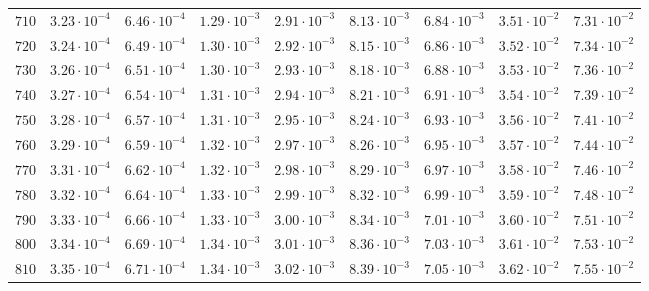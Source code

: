 \begin{landscape}
\begin{table}
\begin{tabular}{lcccccccc}
$	710	$ & $	3.23 \cdot 10^{-4}	$ & $	6.46 \cdot 10^{-4}	$ & $	1.29 \cdot 10^{-3}	$ & $	2.91 \cdot 10^{-3}	$ & $	8.13 \cdot 10^{-3}	$ & $	6.84 \cdot 10^{-3}	$ & $	3.51 \cdot 10^{-2}	$ & $	7.31 \cdot 10^{-2}	 $ \\
$	720	$ & $	3.24 \cdot 10^{-4}	$ & $	6.49 \cdot 10^{-4}	$ & $	1.30 \cdot 10^{-3}	$ & $	2.92 \cdot 10^{-3}	$ & $	8.15 \cdot 10^{-3}	$ & $	6.86 \cdot 10^{-3}	$ & $	3.52 \cdot 10^{-2}	$ & $	7.34 \cdot 10^{-2}	 $ \\
$	730	$ & $	3.26 \cdot 10^{-4}	$ & $	6.51 \cdot 10^{-4}	$ & $	1.30 \cdot 10^{-3}	$ & $	2.93 \cdot 10^{-3}	$ & $	8.18 \cdot 10^{-3}	$ & $	6.88 \cdot 10^{-3}	$ & $	3.53 \cdot 10^{-2}	$ & $	7.36 \cdot 10^{-2}	 $ \\
$	740	$ & $	3.27 \cdot 10^{-4}	$ & $	6.54 \cdot 10^{-4}	$ & $	1.31 \cdot 10^{-3}	$ & $	2.94 \cdot 10^{-3}	$ & $	8.21 \cdot 10^{-3}	$ & $	6.91 \cdot 10^{-3}	$ & $	3.54 \cdot 10^{-2}	$ & $	7.39 \cdot 10^{-2}	 $ \\
$	750	$ & $	3.28 \cdot 10^{-4}	$ & $	6.57 \cdot 10^{-4}	$ & $	1.31 \cdot 10^{-3}	$ & $	2.95 \cdot 10^{-3}	$ & $	8.24 \cdot 10^{-3}	$ & $	6.93 \cdot 10^{-3}	$ & $	3.56 \cdot 10^{-2}	$ & $	7.41 \cdot 10^{-2}	 $ \\
$	760	$ & $	3.29 \cdot 10^{-4}	$ & $	6.59 \cdot 10^{-4}	$ & $	1.32 \cdot 10^{-3}	$ & $	2.97 \cdot 10^{-3}	$ & $	8.26 \cdot 10^{-3}	$ & $	6.95 \cdot 10^{-3}	$ & $	3.57 \cdot 10^{-2}	$ & $	7.44 \cdot 10^{-2}	 $ \\
$	770	$ & $	3.31 \cdot 10^{-4}	$ & $	6.62 \cdot 10^{-4}	$ & $	1.32 \cdot 10^{-3}	$ & $	2.98 \cdot 10^{-3}	$ & $	8.29 \cdot 10^{-3}	$ & $	6.97 \cdot 10^{-3}	$ & $	3.58 \cdot 10^{-2}	$ & $	7.46 \cdot 10^{-2}	 $ \\
$	780	$ & $	3.32 \cdot 10^{-4}	$ & $	6.64 \cdot 10^{-4}	$ & $	1.33 \cdot 10^{-3}	$ & $	2.99 \cdot 10^{-3}	$ & $	8.32 \cdot 10^{-3}	$ & $	6.99 \cdot 10^{-3}	$ & $	3.59 \cdot 10^{-2}	$ & $	7.48 \cdot 10^{-2}	 $ \\
$	790	$ & $	3.33 \cdot 10^{-4}	$ & $	6.66 \cdot 10^{-4}	$ & $	1.33 \cdot 10^{-3}	$ & $	3.00 \cdot 10^{-3}	$ & $	8.34 \cdot 10^{-3}	$ & $	7.01 \cdot 10^{-3}	$ & $	3.60 \cdot 10^{-2}	$ & $	7.51 \cdot 10^{-2}	 $ \\
$	800	$ & $	3.34 \cdot 10^{-4}	$ & $	6.69 \cdot 10^{-4}	$ & $	1.34 \cdot 10^{-3}	$ & $	3.01 \cdot 10^{-3}	$ & $	8.36 \cdot 10^{-3}	$ & $	7.03 \cdot 10^{-3}	$ & $	3.61 \cdot 10^{-2}	$ & $	7.53 \cdot 10^{-2}	 $ \\
$	810	$ & $	3.35 \cdot 10^{-4}	$ & $	6.71 \cdot 10^{-4}	$ & $	1.34 \cdot 10^{-3}	$ & $	3.02 \cdot 10^{-3}	$ & $	8.39 \cdot 10^{-3}	$ & $	7.05 \cdot 10^{-3}	$ & $	3.62 \cdot 10^{-2}	$ & $	7.55 \cdot 10^{-2}	 $ \\

\end{tabular}
\end{table}
\end{landscape}
